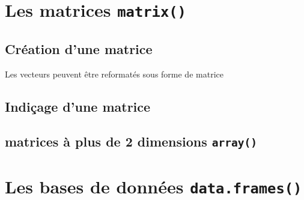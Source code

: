 \documentclass[
]{book}
\begin{document}
\section{\texorpdfstring{Les matrices \texttt{matrix()}}{Les matrices matrix()}}\label{les-matrices-matrix}

\subsection{Création d'une matrice}\label{cruxe9ation-dune-matrice}

Les vecteurs peuvent être reformatés sous forme de matrice

\subsection{Indiçage d'une matrice}\label{indiuxe7age-dune-matrice}

\subsection{\texorpdfstring{matrices à plus de 2 dimensions \texttt{array()}}{matrices à plus de 2 dimensions array()}}\label{matrices-uxe0-plus-de-2-dimensions-array}

\section{\texorpdfstring{Les bases de données \texttt{data.frames()}}{Les bases de données data.frames()}}\label{les-bases-de-donnuxe9es-data.frames}
\end{document}
